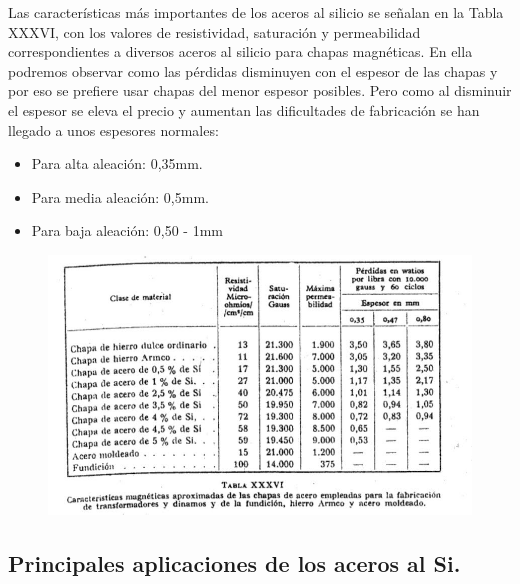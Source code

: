 \documentclass[12pt,a4paper]{article}
\begin{document}
Las características más importantes de los aceros al silicio se señalan en la Tabla XXXVI, con los valores de resistividad, saturación y permeabilidad correspondientes a diversos aceros al silicio para chapas magnéticas. En ella podremos observar como las pérdidas disminuyen con el espesor de las chapas y por eso se prefiere usar chapas del menor espesor posibles. Pero como al disminuir el espesor se eleva el precio y aumentan las dificultades de fabricación se han llegado a unos espesores normales:

\begin{itemize}
    \item Para alta aleación: 0,35mm.
    \item Para media aleación: 0,5mm.
    \item Para baja aleación: 0,50 - 1mm
\end{itemize}

\begin{figure}[H]    
    \centering         
    \includegraphics[width=1\textwidth]{IMAGENES LATEX/6.jpg}
\end{figure}

\subsection{Principales aplicaciones de los aceros al Si.}
\end{document}
